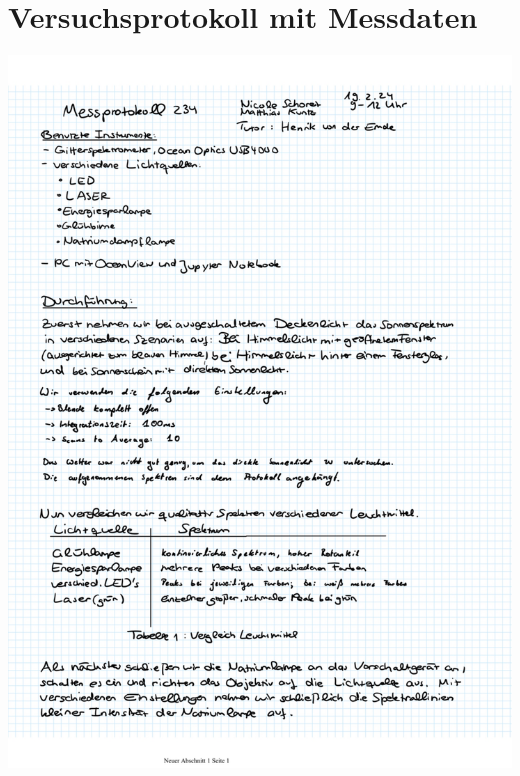 \documentclass{article}
\begin{document}
\newpage

\section{Versuchsprotokoll mit Messdaten}

\includegraphics[width=\textwidth]{graphics/mess1.jpeg}
\newpage
\end{document}

